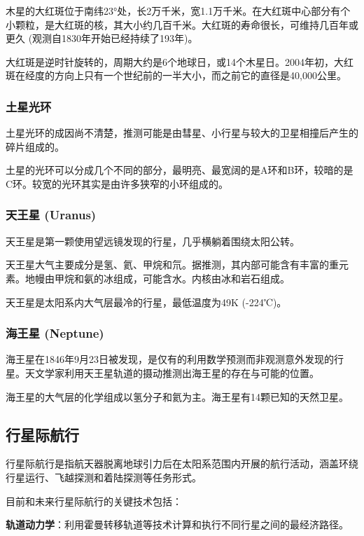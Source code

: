 \documentclass[12pt,a4paper]{article}
\begin{document}
	木星的大红斑位于南纬23°处，长2万千米，宽1.1万千米。在大红斑中心部分有个小颗粒，是大红斑的核，其大小约几百千米。大红斑的寿命很长，可维持几百年或更久 (观测自1830年开始已经持续了193年)。
	
	大红斑是逆时针旋转的，周期大约是6个地球日，或14个木星日。2004年初，大红斑在经度的方向上只有一个世纪前的一半大小，而之前它的直径是40,000公里。
	
	\subsubsection{土星光环}
	
	土星光环的成因尚不清楚，推测可能是由彗星、小行星与较大的卫星相撞后产生的碎片组成的。
	
	土星的光环可以分成几个不同的部分，最明亮、最宽阔的是A环和B环，较暗的是C环。较宽的光环其实是由许多狭窄的小环组成的。
	
	\subsubsection{天王星 (Uranus)}
	
	天王星是第一颗使用望远镜发现的行星，几乎横躺着围绕太阳公转。
	
	天王星大气主要成分是氢、氦、甲烷和氘。据推测，其内部可能含有丰富的重元素。地幔由甲烷和氨的冰组成，可能含水。内核由冰和岩石组成。
	
	天王星是太阳系内大气层最冷的行星，最低温度为49K (-224℃)。
	
	\subsubsection{海王星 (Neptune)}
	
	海王星在1846年9月23日被发现，是仅有的利用数学预测而非观测意外发现的行星。天文学家利用天王星轨道的摄动推测出海王星的存在与可能的位置。
	
	海王星的大气层的化学组成以氢分子和氦为主。海王星有14颗已知的天然卫星。
	
	\subsection{行星际航行}
	
	行星际航行是指航天器脱离地球引力后在太阳系范围内开展的航行活动，涵盖环绕行星运行、飞越探测和着陆探测等任务形式。
	
	目前和未来行星际航行的关键技术包括：
	
	\textbf{轨道动力学}：利用霍曼转移轨道等技术计算和执行不同行星之间的最经济路径。
	
\end{document}
